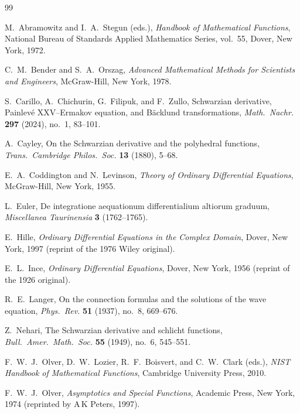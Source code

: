 \documentclass{amsart}
\theoremstyle{definition}
\theoremstyle{remark}
\begin{document}
\begin{thebibliography}{99}

M.~Abramowitz and I.~A.~Stegun (eds.),
\textit{Handbook of Mathematical Functions},
National Bureau of Standards Applied Mathematics Series, vol.~55,
Dover, New York, 1972.

C.~M.~Bender and S.~A.~Orszag,
\textit{Advanced Mathematical Methods for Scientists and Engineers},
McGraw-Hill, New York, 1978.

S.~Carillo, A.~Chichurin, G.~Filipuk, and F.~Zullo,
Schwarzian derivative, Painlev\'e XXV--Ermakov equation, and B\"acklund transformations,
\textit{Math.\ Nachr.} \textbf{297} (2024), no.~1, 83--101.

A.~Cayley,
On the Schwarzian derivative and the polyhedral functions,
\textit{Trans.\ Cambridge Philos.\ Soc.} \textbf{13} (1880), 5--68.

E.~A.~Coddington and N.~Levinson,
\textit{Theory of Ordinary Differential Equations},
McGraw-Hill, New York, 1955.

L.~Euler,
De integratione aequationum differentialium altiorum graduum,
\textit{Miscellanea Taurinensia} \textbf{3} (1762--1765).

E.~Hille,
\textit{Ordinary Differential Equations in the Complex Domain},
Dover, New York, 1997 (reprint of the 1976 Wiley original).

E.~L.~Ince,
\textit{Ordinary Differential Equations},
Dover, New York, 1956 (reprint of the 1926 original).

R.~E.~Langer,
On the connection formulas and the solutions of the wave equation,
\textit{Phys.\ Rev.} \textbf{51} (1937), no.~8, 669--676.

Z.~Nehari,
The Schwarzian derivative and schlicht functions,
\textit{Bull.\ Amer.\ Math.\ Soc.} \textbf{55} (1949), no.~6, 545--551.

F.~W.~J.~Olver, D.~W.~Lozier, R.~F.~Boisvert, and C.~W.~Clark (eds.),
\textit{NIST Handbook of Mathematical Functions},
Cambridge University Press, 2010.

F.~W.~J.~Olver,
\textit{Asymptotics and Special Functions},
Academic Press, New York, 1974 (reprinted by A\,K Peters, 1997).


\end{thebibliography}
\end{document}
